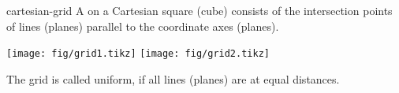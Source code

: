 \begin{Definition}{cartesian-grid}
  A  on a Cartesian square (cube) consists of
  the intersection points of lines (planes) parallel to the coordinate
  axes (planes).
  \begin{center}
    \texttt{[image: fig/grid1.tikz]}
    \hfil
    \texttt{[image: fig/grid2.tikz]}
  \end{center}
  The grid is called uniform, if all lines (planes) are at equal distances.
\end{Definition}


